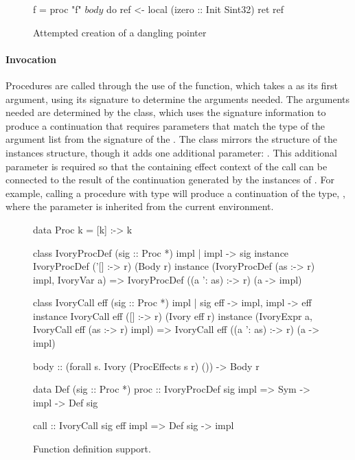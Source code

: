 \begin{figure}[t]
\begin{code}
f = proc "f" $ body $ do
  ref <- local (izero :: Init Sint32)
  ret ref
\end{code}
\caption{Attempted creation of a dangling pointer}
\label{fig:proc-def}
\end{figure}

\paragraph{Invocation} Procedures are called through the use of the  function,
which takes a  as its first argument, using its signature to determine
the arguments needed.  The arguments needed are determined by the 
class, which uses the signature information to produce a continuation that
requires parameters that match the type of the argument list from the signature
of the .  The  class mirrors the structure of the
 instances structure, though it adds one additional parameter:
.  This additional parameter is required so that the containing effect
context of the call can be connected to the result of the continuation generated
by the instances of .  For example, calling a procedure with type
 will produce a continuation of the type,
, where the  parameter is inherited from
the current environment.

\begin{figure}[t]
\begin{code}
data Proc k = [k] :-> k

class IvoryProcDef (sig :: Proc *) impl | impl -> sig
instance IvoryProcDef ('[] :-> r) (Body r)
instance (IvoryProcDef (as :-> r) impl, IvoryVar a)
  => IvoryProcDef ((a ': as) :-> r) (a -> impl)

class IvoryCall eff (sig :: Proc *) impl
  | sig eff -> impl, impl -> eff
instance IvoryCall eff ([] :-> r) (Ivory eff r)
instance (IvoryExpr a, IvoryCall eff (as :-> r) impl)
  => IvoryCall eff ((a ': as) :-> r) (a -> impl)

body :: (forall s. Ivory (ProcEffects s r) ())
     -> Body r

data Def (sig :: Proc *)
proc :: IvoryProcDef sig impl
     => Sym -> impl -> Def sig

call :: IvoryCall sig eff impl => Def sig -> impl
\end{code}
\caption{Function definition support.}
\label{fig:proc-defs}
\end{figure}


